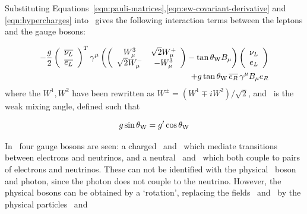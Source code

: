 
Substituting
Equations~\ref{eqn:pauli-matrices},\ref{eqn:ew-covariant-derivative} and \ref{eqn:hypercharges}
 into~ gives the following
interaction terms between the leptons and the gauge bosons:

\begin{equation}
\begin{split}
- \frac{g}{2}
\left( \begin{array}{c}\overline{\nu_{L}} \\  \overline{e_{L}} \end{array} \right)^{T}
\gamma^{\mu} \left(
\left( \begin{array}{cc} W^{3}_{\mu} & \sqrt{2} W^{+}_{\mu} \\ \sqrt{2} W^{-}_{\mu} & -
W^{3}_{\mu} \end{array} \right)
- \tan{\ensuremath{\theta_{\mathrm{W}}}} B_{\mu} \right)
\left( \begin{array}{c} \nu_{L} \\  e_{L} \end{array} \right) \\
+ g \tan{\ensuremath{\theta_{\mathrm{W}}}} \, \overline{e_{R}} \, \gamma^{\mu} B_{\mu} e_{R}
\end{split}
\label{eqn:ew-lepton-interactions}
\end{equation}
where the $W^{1}, W^{2}$ have been rewritten as $W^{\pm} = (W^{1} \mp
iW^{2})/\sqrt{2}$, and \thetaW\ is the weak mixing angle, defined such that

\begin{equation}
g \sin{\ensuremath{\theta_{\mathrm{W}}}} = g' \cos{\ensuremath{\theta_{\mathrm{W}}}}
\end{equation}

In~ four gauge bosons are seen: a charged \Wp\ and
\Wm\ which mediate transitions between electrons and neutrinos, and a neutral
\Wthreemu\ and \Bmu\ which both couple to pairs of electrons and neutrinos.
These can not be identified with the physical \Z\ boson and photon, since the
photon does not couple to the neutrino.  However, the physical bosons can be
obtained by a `rotation', replacing the fields \Wthreemu\ and \Bmu\ by the
physical particles \Zmu\ and \Amu

